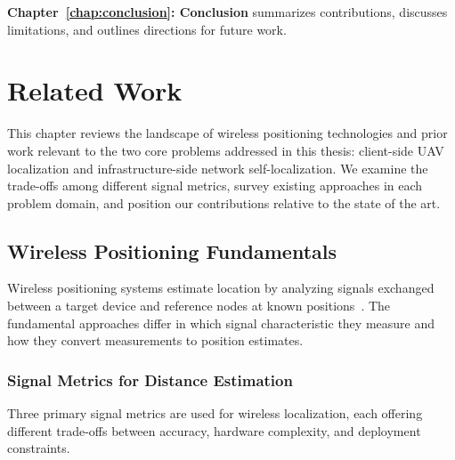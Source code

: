 \documentclass[master,final,11pt]{iscs-thesis}
\begin{document}
\textbf{Chapter~\ref{chap:conclusion}: Conclusion} summarizes contributions, discusses limitations, and outlines directions for future work.

\chapter{Related Work}
\label{chap:related_work}

This chapter reviews the landscape of wireless positioning technologies and prior work relevant to the two core problems addressed in this thesis: client-side UAV localization and infrastructure-side network self-localization.
We examine the trade-offs among different signal metrics, survey existing approaches in each problem domain, and position our contributions relative to the state of the art.

\section{Wireless Positioning Fundamentals}
\label{sec:positioning_fundamentals}

Wireless positioning systems estimate location by analyzing signals exchanged between a target device and reference nodes at known positions~\cite{zafari2019survey}.
The fundamental approaches differ in which signal characteristic they measure and how they convert measurements to position estimates.

\subsection{Signal Metrics for Distance Estimation}

Three primary signal metrics are used for wireless localization, each offering different trade-offs between accuracy, hardware complexity, and deployment constraints.
\end{document}
